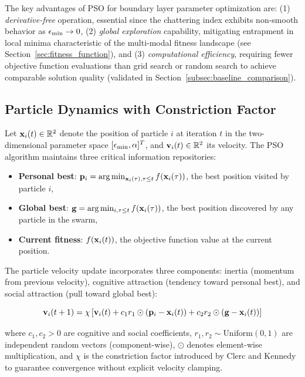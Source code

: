 The key advantages of PSO for boundary layer parameter optimization are: (1) \textit{derivative-free} operation, essential since the chattering index exhibits non-smooth behavior as $\epsilon_{\min} \to 0$, (2) \textit{global exploration} capability, mitigating entrapment in local minima characteristic of the multi-modal fitness landscape (see Section~\ref{sec:fitness_function}), and (3) \textit{computational efficiency}, requiring fewer objective function evaluations than grid search or random search to achieve comparable solution quality (validated in Section~\ref{subsec:baseline_comparison}).

\subsection{Particle Dynamics with Constriction Factor}
\label{subsec:particle_dynamics}

Let $\mathbf{x}_i(t) \in \mathbb{R}^2$ denote the position of particle $i$ at iteration $t$ in the two-dimensional parameter space $[\epsilon_{\min}, \alpha]^T$, and $\mathbf{v}_i(t) \in \mathbb{R}^2$ its velocity. The PSO algorithm maintains three critical information repositories:

\begin{itemize}
    \item \textbf{Personal best}: $\mathbf{p}_i = \arg\min_{\mathbf{x}_i(\tau), \tau \leq t} f(\mathbf{x}_i(\tau))$, the best position visited by particle $i$,
    \item \textbf{Global best}: $\mathbf{g} = \arg\min_{i,\tau \leq t} f(\mathbf{x}_i(\tau))$, the best position discovered by any particle in the swarm,
    \item \textbf{Current fitness}: $f(\mathbf{x}_i(t))$, the objective function value at the current position.
\end{itemize}

The particle velocity update incorporates three components: inertia (momentum from previous velocity), cognitive attraction (tendency toward personal best), and social attraction (pull toward global best):

\begin{equation}
\label{eq:pso_velocity}
\mathbf{v}_i(t+1) = \chi \left[ \mathbf{v}_i(t) + c_1 r_1 \odot (\mathbf{p}_i - \mathbf{x}_i(t)) + c_2 r_2 \odot (\mathbf{g} - \mathbf{x}_i(t)) \right]
\end{equation}

where $c_1, c_2 > 0$ are cognitive and social coefficients, $r_1, r_2 \sim \text{Uniform}(0,1)$ are independent random vectors (component-wise), $\odot$ denotes element-wise multiplication, and $\chi$ is the constriction factor introduced by Clerc and Kennedy~\cite{clerc2002particle} to guarantee convergence without explicit velocity clamping.

